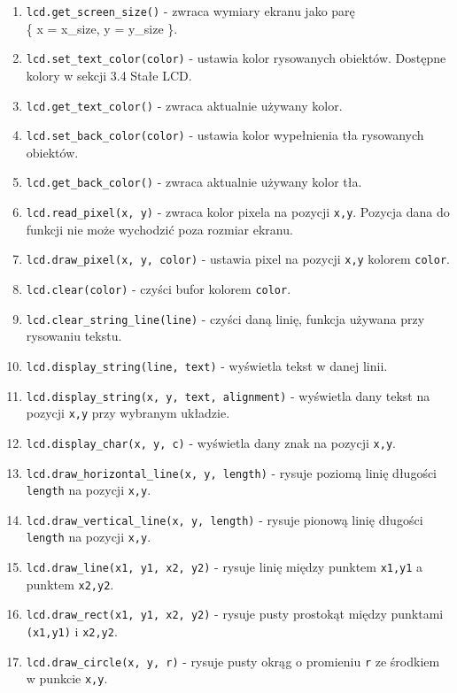 \documentclass{article}
\begin{document}
\begin{enumerate}
  \item \texttt{lcd.get\_screen\_size()} - zwraca wymiary ekranu jako parę\\\{ x = x\_size, y = y\_size \}.
  \item \texttt{lcd.set\_text\_color(color)} - ustawia kolor rysowanych obiektów. Dostępne kolory w sekcji 3.4 Stałe LCD.
  \item \texttt{lcd.get\_text\_color()} - zwraca aktualnie używany kolor.
  \item \texttt{lcd.set\_back\_color(color)} - ustawia kolor wypełnienia tła rysowanych obiektów.
  \item \texttt{lcd.get\_back\_color()} - zwraca aktualnie używany kolor tła.
  \item \texttt{lcd.read\_pixel(x, y)} - zwraca kolor pixela na pozycji \texttt{x,y}. Pozycja dana do funkcji nie może wychodzić poza rozmiar ekranu.
  \item \texttt{lcd.draw\_pixel(x, y, color)} - ustawia pixel na pozycji \texttt{x,y} kolorem \texttt{color}.
  \item \texttt{lcd.clear(color)} - czyści bufor kolorem \texttt{color}.
  \item \texttt{lcd.clear\_string\_line(line)} - czyści daną linię, funkcja używana przy rysowaniu tekstu.
  \item \texttt{lcd.display\_string(line, text)} - wyświetla tekst w danej linii.
  \item \texttt{lcd.display\_string(x, y, text, alignment)} - wyświetla dany tekst na pozycji \texttt{x,y} przy wybranym układzie.
  \item \texttt{lcd.display\_char(x, y, c)} - wyświetla dany znak na pozycji \texttt{x,y}.
  \item \texttt{lcd.draw\_horizontal\_line(x, y, length)} - rysuje poziomą linię długości \texttt{length} na pozycji \texttt{x,y}.
  \item \texttt{lcd.draw\_vertical\_line(x, y, length)} - rysuje pionową linię długości \texttt{length} na pozycji \texttt{x,y}.
  \item \texttt{lcd.draw\_line(x1, y1, x2, y2)} - rysuje linię między punktem \texttt{x1,y1} a punktem \texttt{x2,y2}.
  \item \texttt{lcd.draw\_rect(x1, y1, x2, y2)} - rysuje pusty prostokąt między punktami \texttt{(x1,y1)} i \texttt{x2,y2}.
  \item \texttt{lcd.draw\_circle(x, y, r)} - rysuje pusty okrąg o promieniu \texttt{r} ze środkiem w punkcie \texttt{x,y}.

\end{enumerate}
\end{document}

